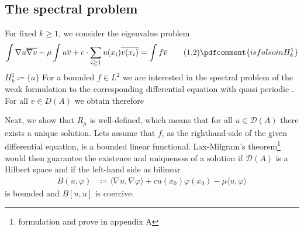 \documentclass[14pt,a4paper]{scrartcl}
\numberwithin{equation}{section}
\begin{document}
	\subsection{The spectral problem}	
	For fixed $k \geq 1$, we consider the eigenvalue problem 
	\begin{align*}
		\int \nabla u \overline{\nabla v} - \mu \int u \overline{v} + c \cdot \sum_{i \geq 1} u(x_{i}) \overline{v(x_{i})} = \int f \overline{v} \tag{1.2} \label{1.2} \pdfcomment{is f also in H^{1}_{k}}
	\end{align*}
	$H^{1}_{k} \coloneqq \{ a \}$
	For a bounded $f \in L^{2}$ we are interested in the spectral problem of the weak formulation to the corresponding differential equation with quasi periodic . For all $v \in D(A)$ we obtain therefore 

	Next, we show that $R_{\mu}$ is well-defined, which means that for all $u \in \mathcal{D}(A)$ there exists a unique solution. Lets assume that $f$, as the righthand-side of the given differential equation, is a bounded linear functional. Lax-Milgram's theorem\footnote{formulation and prove in appendix A} would then guarantee the existence and uniqueness of a solution if $\mathcal{D}(A)$ is a Hilbert space and if the left-hand side as bilinear 
	\begin{align*}
		B(u, \varphi) & \coloneqq \langle \nabla u, \nabla \varphi \rangle + c u(x_{0}) \varphi(x_{0}) - \mu \langle u , \varphi \rangle 
	\end{align*}  
	is bounded and $B[u,u]$ is coercive.
	
\end{document}
